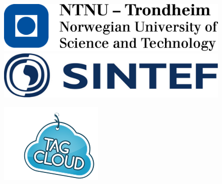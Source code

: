 \documentclass[11pt]{book}
\begin{document}
\begin{titlepage}
\begin{center}
        
        \begin{figure}[hb]
            \begin{minipage}[b]{0.45\linewidth}
                \centering
                \includegraphics[width=\textwidth]{images/ntnu_logo}
            \end{minipage}
            \hspace{0.5cm}
            \begin{minipage}[b]{0.45\linewidth}
                \centering
                \includegraphics[width=\textwidth]{images/sintef}
            \end{minipage}
        \end{figure}
        \begin{figure}[hb]
            \begin{minipage}[b]{0.45\linewidth}
                \centering
                \includegraphics[width=\textwidth]{images/tagcloud}
            \end{minipage}

\end{figure}
\end{center}
\end{titlepage}
\end{document}
